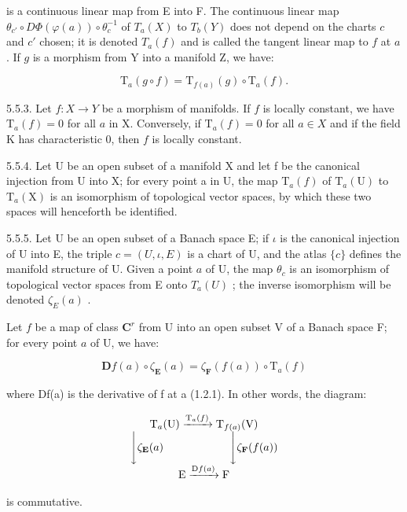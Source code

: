 is a continuous linear map from E into F. The continuous linear map \(\theta_{c'} \circ D\Phi(\varphi(a)) \circ \theta_{c}^{-1}\) of \(T_{a}(X)\) to \(T_{b}(Y)\) does not depend on the charts \(c\) and \(c'\) chosen; it is denoted \(T_{a}(f)\) and is called the tangent linear map to \(f\) at \(a\) . If \(g\) is a morphism from Y into a manifold Z, we have:

\[
\mathrm{T} _ {a} (g \circ f) = \mathrm{T} _ {f (a)} (g) \circ \mathrm{T} _ {a} (f).
\]

5.5.3. Let \(f:X\to Y\) be a morphism of manifolds. If \(f\) is locally constant, we have \(\mathrm{T}_{a}(f)=0\) for all \(a\) in X. Conversely, if \(\mathrm{T}_{a}(f)=0\) for all \(a\in X\) and if the field K has characteristic 0, then \(f\) is locally constant.

5.5.4. Let U be an open subset of a manifold X and let f be the canonical injection from U into X; for every point a in U, the map \(\mathrm{T}_{a}(f)\) of \(\mathrm{T}_{a}(\mathrm{U})\) to \(\mathrm{T}_{a}(\mathrm{X})\) is an isomorphism of topological vector spaces, by which these two spaces will henceforth be identified.

5.5.5. Let U be an open subset of a Banach space E; if \(\iota\) is the canonical injection of U into E, the triple \(c = (U, \iota, E)\) is a chart of U, and the atlas \(\{c\}\) defines the manifold structure of U. Given a point \(a\) of U, the map \(\theta_c\) is an isomorphism of topological vector spaces from E onto \(T_a(U)\) ; the inverse isomorphism will be denoted \(\zeta_E(a)\) .

Let \(f\) be a map of class \(\mathbf{C}^{r}\) from U into an open subset V of a Banach space F; for every point \(a\) of U, we have:

\[
\mathbf {D} f (a) \circ \zeta_ {\mathbf {E}} (a) = \zeta_ {\mathbf {F}} (f (a)) \circ \mathrm{T} _ {a} (f)
\]

where Df(a) is the derivative of f at a (1.2.1). In other words, the diagram:

\[
\begin{array}{c} \mathrm{T} _ {a} (\mathrm{U}) \xrightarrow {\mathrm{T} _ {a} (f)} \mathrm{T} _ {f (a)} (\mathrm{V}) \\ \Biggl \downarrow \zeta_ {\mathbf {E}} (a) \qquad \qquad \qquad \Biggl \downarrow \zeta_ {\mathbf {F}} (f (a)) \\ \mathrm{E} \xrightarrow {\mathrm{D} f (a)} \mathrm{F} \end{array}
\]

is commutative.


